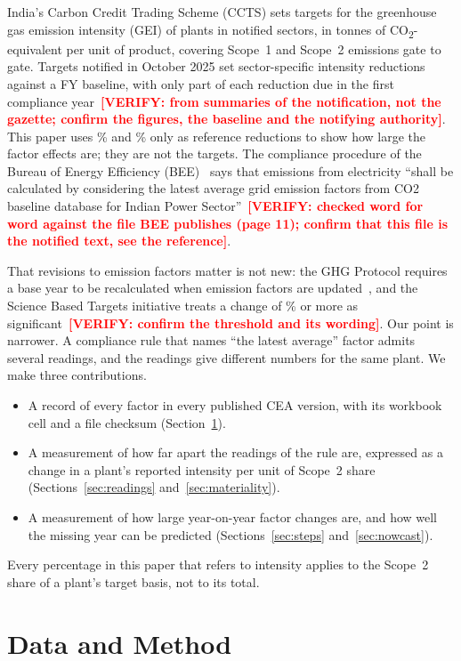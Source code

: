 \documentclass[conference]{IEEEtran}
\newcommand{\verify}[1]{\textcolor{red}{\textbf{[VERIFY: #1]}}}
\begin{document}
India's Carbon Credit Trading Scheme (CCTS) sets targets for the greenhouse gas emission intensity (GEI) of plants in notified sectors, in tonnes of CO\textsubscript{2}-equivalent per unit of product, covering Scope~1 and Scope~2 emissions gate to gate. Targets notified in October 2025 set sector-specific intensity reductions against a FY\baseYear{} baseline, with only part of each reduction due in the first compliance year~\verify{from summaries of the notification, not the gazette; confirm the figures, the baseline and the notifying authority}. This paper uses \tgtLow{}\% and \tgtHigh{}\% only as reference reductions to show how large the factor effects are; they are not the targets. The compliance procedure of the Bureau of Energy Efficiency (BEE)~\cite{bee} says that emissions from electricity ``shall be calculated by considering the latest average grid emission factors from CO2 baseline database for Indian Power Sector''~\verify{checked word for word against the file BEE publishes (page 11); confirm that this file is the notified text, see the reference}.

That revisions to emission factors matter is not new: the GHG Protocol requires a base year to be recalculated when emission factors are updated~\cite{ghg,scope2}, and the Science Based Targets initiative treats a change of \thresh{}\% or more as significant~\cite{sbti}\verify{confirm the threshold and its wording}. Our point is narrower. A compliance rule that names ``the latest average'' factor admits several readings, and the readings give different numbers for the same plant. We make three contributions.
\begin{itemize}
\item A record of every factor in every published CEA version, with its workbook cell and a file checksum (Section~\ref{sec:data}).
\item A measurement of how far apart the readings of the rule are, expressed as a change in a plant's reported intensity per unit of Scope~2 share (Sections~\ref{sec:readings} and~\ref{sec:materiality}).
\item A measurement of how large year-on-year factor changes are, and how well the missing year can be predicted (Sections~\ref{sec:steps} and~\ref{sec:nowcast}).
\end{itemize}
Every percentage in this paper that refers to intensity applies to the Scope~2 share of a plant's target basis, not to its total.

\section{Data and Method}\label{sec:data}
\end{document}
